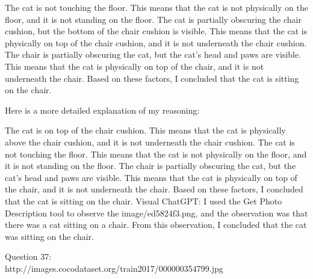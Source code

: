 \begin{enumerate}
        The cat is not touching the floor. This means that the cat is not physically on the floor, and it is not standing on the floor.
        The cat is partially obscuring the chair cushion, but the bottom of the chair cushion is visible. This means that the cat is physically on top of the chair cushion, and it is not underneath the chair cushion.
        The chair is partially obscuring the cat, but the cat's head and paws are visible. This means that the cat is physically on top of the chair, and it is not underneath the chair.
        Based on these factors, I concluded that the cat is sitting on the chair.

        Here is a more detailed explanation of my reasoning:

        The cat is on top of the chair cushion. This means that the cat is physically above the chair cushion, and it is not underneath the chair cushion.
        The cat is not touching the floor. This means that the cat is not physically on the floor, and it is not standing on the floor.
        The chair is partially obscuring the cat, but the cat's head and paws are visible. This means that the cat is physically on top of the chair, and it is not underneath the chair.
        Based on these factors, I concluded that the cat is sitting on the chair.
        \subitem Visual ChatGPT: I used the Get Photo Description tool to observe the image/ed5824f3.png, and the observation was that there was a cat sitting on a chair. From this observation, I concluded that the cat was sitting on the chair.
    \end{enumerate}
    Question 37:\\http://images.cocodataset.org/train2017/000000354799.jpg
